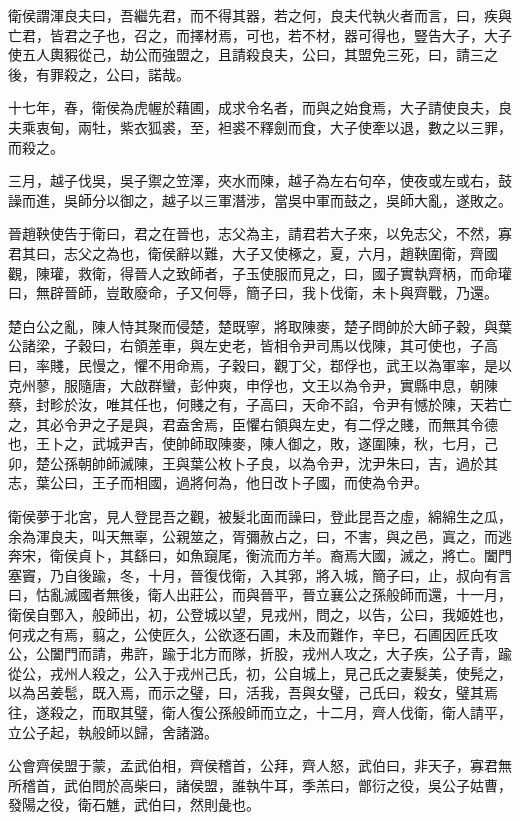 \begin{pinyinscope}
衛侯謂渾良夫曰，吾繼先君，而不得其器，若之何，良夫代執火者而言，曰，疾與亡君，皆君之子也，召之，而擇材焉，可也，若不材，器可得也，豎告大子，大子使五人輿豭從己，劫公而強盟之，且請殺良夫，公曰，其盟免三死，曰，請三之後，有罪殺之，公曰，諾哉。

十七年，春，衛侯為虎幄於藉圃，成求令名者，而與之始食焉，大子請使良夫，良夫乘衷甸，兩牡，紫衣狐裘，至，袒裘不釋劍而食，大子使牽以退，數之以三罪，而殺之。

三月，越子伐吳，吳子禦之笠澤，夾水而陳，越子為左右句卒，使夜或左或右，鼓譟而進，吳師分以御之，越子以三軍潛涉，當吳中軍而鼓之，吳師大亂，遂敗之。

晉趙鞅使告于衛曰，君之在晉也，志父為主，請君若大子來，以免志父，不然，寡君其曰，志父之為也，衛侯辭以難，大子又使椓之，夏，六月，趙鞅圍衛，齊國觀，陳瓘，救衛，得晉人之致師者，子玉使服而見之，曰，國子實執齊柄，而命瓘曰，無辟晉師，豈敢廢命，子又何辱，簡子曰，我卜伐衛，未卜與齊戰，乃還。

楚白公之亂，陳人恃其聚而侵楚，楚既寧，將取陳麥，楚子問帥於大師子穀，與葉公諸梁，子穀曰，右領差車，與左史老，皆相令尹司馬以伐陳，其可使也，子高曰，率賤，民慢之，懼不用命焉，子穀曰，觀丁父，鄀俘也，武王以為軍率，是以克州蓼，服隨唐，大啟群蠻，彭仲爽，申俘也，文王以為令尹，實縣申息，朝陳蔡，封畛於汝，唯其任也，何賤之有，子高曰，天命不諂，令尹有憾於陳，天若亡之，其必令尹之子是與，君盍舍焉，臣懼右領與左史，有二俘之賤，而無其令德也，王卜之，武城尹吉，使帥師取陳麥，陳人御之，敗，遂圍陳，秋，七月，己卯，楚公孫朝帥師滅陳，王與葉公枚卜子良，以為令尹，沈尹朱曰，吉，過於其志，葉公曰，王子而相國，過將何為，他日改卜子國，而使為令尹。

衛侯夢于北宮，見人登昆吾之觀，被髮北面而譟曰，登此昆吾之虛，綿綿生之瓜，余為渾良夫，叫天無辜，公親筮之，胥彌赦占之，曰，不害，與之邑，寘之，而逃奔宋，衛侯貞卜，其繇曰，如魚竀尾，衡流而方羊。裔焉大國，滅之，將亡。闔門塞竇，乃自後踰，冬，十月，晉復伐衛，入其郛，將入城，簡子曰，止，叔向有言曰，怙亂滅國者無後，衛人出莊公，而與晉平，晉立襄公之孫般師而還，十一月，衛侯自鄄入，般師出，初，公登城以望，見戎州，問之，以告，公曰，我姬姓也，何戎之有焉，翦之，公使匠久，公欲逐石圃，未及而難作，辛巳，石圃因匠氏攻公，公闔門而請，弗許，踰于北方而隊，折股，戎州人攻之，大子疾，公子青，踰從公，戎州人殺之，公入于戎州己氏，初，公自城上，見己氏之妻髮美，使髡之，以為呂姜髢，既入焉，而示之璧，曰，活我，吾與女璧，己氏曰，殺女，璧其焉往，遂殺之，而取其璧，衛人復公孫般師而立之，十二月，齊人伐衛，衛人請平，立公子起，執般師以歸，舍諸潞。

公會齊侯盟于蒙，孟武伯相，齊侯稽首，公拜，齊人怒，武伯曰，非天子，寡君無所稽首，武伯問於高柴曰，諸侯盟，誰執牛耳，季羔曰，鄫衍之役，吳公子姑曹，發陽之役，衛石魋，武伯曰，然則彘也。


\end{pinyinscope}
